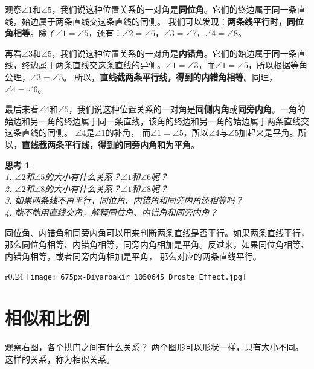\documentclass[12pt,UTF8]{ctexbook}
\newtheorem{sk}{思考}[section]
\begin{document}
观察$\angle 1$和$\angle 5$，我们说这种位置关系的一对角是\textbf{同位角}。它们的终边属于同一条直线，始边属于两条直线交这条直线的同侧。
我们可以发现：\textbf{两条线平行时，同位角相等}。除了$\angle 1 = \angle 5$，还有：$\angle 2 = \angle 6$，$\angle 3 = \angle 7$，$\angle 4 = \angle 8$。

再看$\angle 3$和$\angle 5$，我们说这种位置关系的一对角是\textbf{内错角}。它们的始边属于同一条直线，终边属于两条直线交这条直线的异侧。$\angle 1 = \angle 3$，而$\angle 1 = \angle 5$，所以根据等角公理，$\angle 3 = \angle 5$。
所以，\textbf{直线截两条平行线，得到的内错角相等}。同理，$\angle 4 = \angle 6$。

最后来看$\angle 4$和$\angle 5$，我们说这种位置关系的一对角是\textbf{同侧内角}或\textbf{同旁内角}。一角的始边和另一角的终边属于同一条直线，该角的终边和另一角的始边属于两条直线交这条直线的同侧。
$\angle 4$是$\angle 1$的补角，
而$\angle 1 = \angle 5$，所以$\angle 4$与$\angle 5$加起来是平角。所以，\textbf{直线截两条平行线，得到的同旁内角和为平角}。

\begin{sk}\label{sk:1-1-0}
    \mbox{}\\
    1. $\angle 2$和$\angle 5$的大小有什么关系？$\angle 1$和$\angle 6$呢？\\
    2. $\angle 2$和$\angle 8$的大小有什么关系？$\angle 1$和$\angle 8$呢？\\
    3. 如果两条线不再平行，同位角、内错角和同旁内角还相等吗？\\
    4. 能不能用直线交角，解释同位角、内错角和同旁内角？
\end{sk}

同位角、内错角和同旁内角可以用来判断两条直线是否平行。如果两条直线平行，
那么同位角相等、内错角相等，同旁内角相加是平角。反过来，如果同位角相等、内错角相等，或者同旁内角相加是平角，
那么对应的两条直线平行。
\begin{wrapfigure}[6]{r}{0.24\textwidth} %
    \vspace{50pt}
    \flushright
    \texttt{[image: 675px-Diyarbakir\_1050645\_Droste\_Effect.jpg]}
\end{wrapfigure}

\section{相似和比例}
观察右图，各个拱门之间有什么关系？
两个图形可以形状一样，只有大小不同。
这样的关系，称为相似关系。
\end{document}
